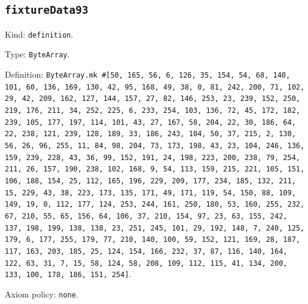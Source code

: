 \documentclass[11pt]{article}
\begin{document}
\subsection*{\texttt{fixtureData93}}
\noindent Kind: \texttt{definition}.\par
\noindent Type: \texttt{ByteArray}.\par
\noindent Definition: \texttt{ByteArray.mk \#[50, 165, 56, 6, 126, 35, 154, 54, 68, 140, 101, 60, 136, 169, 130, 42, 95, 168, 49, 38, 0, 81, 242, 200, 71, 102, 29, 42, 209, 162, 127, 144, 157, 27, 82, 146, 253, 23, 239, 152, 250, 219, 176, 211, 34, 252, 225, 6, 233, 254, 103, 136, 72, 45, 172, 182, 239, 105, 177, 197, 114, 101, 43, 27, 167, 58, 204, 22, 30, 186, 64, 22, 238, 121, 239, 128, 189, 33, 186, 243, 104, 50, 37, 215, 2, 130, 56, 26, 96, 255, 11, 84, 98, 204, 73, 173, 198, 43, 23, 104, 246, 136, 159, 239, 228, 43, 36, 99, 152, 191, 24, 198, 223, 200, 238, 79, 254, 211, 26, 157, 190, 238, 102, 168, 9, 54, 113, 159, 215, 221, 105, 151, 106, 188, 154, 25, 112, 165, 196, 229, 209, 177, 234, 185, 132, 211, 15, 229, 43, 38, 223, 173, 135, 171, 49, 171, 119, 54, 150, 88, 109, 149, 19, 0, 112, 177, 124, 253, 244, 161, 250, 180, 53, 160, 255, 232, 67, 210, 55, 65, 156, 64, 106, 37, 210, 154, 97, 23, 63, 155, 242, 137, 198, 199, 138, 138, 23, 251, 245, 101, 29, 192, 148, 7, 240, 125, 179, 6, 177, 255, 179, 77, 210, 140, 100, 59, 152, 121, 169, 28, 187, 117, 163, 203, 185, 25, 124, 154, 166, 232, 37, 87, 116, 140, 164, 122, 63, 31, 7, 15, 58, 124, 58, 208, 109, 112, 115, 41, 134, 200, 133, 100, 178, 186, 151, 254]}.\par
\noindent Axiom policy: \texttt{none}.\par
\end{document}
